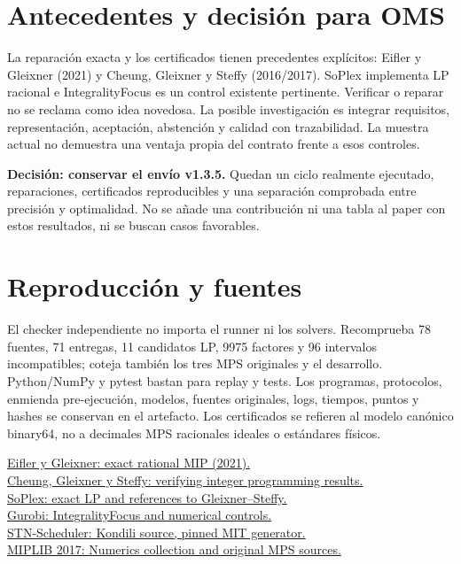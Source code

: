 \documentclass[10pt,a4paper]{article}
\begin{document}
\section*{Antecedentes y decisión para OMS}
La reparación exacta y los certificados tienen precedentes explícitos:
Eifler y Gleixner (2021) y Cheung, Gleixner y Steffy (2016/2017).
SoPlex implementa LP racional e IntegralityFocus es un control existente
pertinente. Verificar o reparar no se reclama como idea novedosa.
La posible investigación es integrar requisitos, representación, aceptación,
abstención y calidad con trazabilidad. La muestra actual no demuestra una
ventaja propia del contrato frente a esos controles.

\textbf{Decisión: conservar el envío v1.3.5.} Quedan un ciclo realmente
ejecutado, reparaciones, certificados reproducibles y una separación
comprobada entre precisión y optimalidad. No se añade una contribución
ni una tabla al paper con estos resultados, ni se buscan casos favorables.
\section*{Reproducción y fuentes}
El checker independiente no importa el runner ni los solvers. Recomprueba
78 fuentes, 71 entregas, 11 candidatos LP, 9975 factores y 96 intervalos
incompatibles; coteja también los tres MPS originales y el desarrollo. Python/NumPy y
pytest bastan para replay y tests. Los programas, protocolos, enmienda
pre-ejecución, modelos, fuentes originales, logs, tiempos, puntos y hashes
se conservan en el artefacto. Los certificados se refieren al modelo
canónico binary64, no a decimales MPS racionales ideales o estándares físicos.

\small
\href{https://arxiv.org/abs/2101.09141}{Eifler y Gleixner: exact rational MIP (2021).}\\
\href{https://arxiv.org/abs/1611.08832}{Cheung, Gleixner y Steffy: verifying integer programming results.}\\
\href{https://soplex.zib.de/doc/html/EXACT.php}{SoPlex: exact LP and references to Gleixner--Steffy.}\\
\href{https://docs.gurobi.com/projects/optimizer/en/current/reference/parameters.html}{Gurobi: IntegralityFocus and numerical controls.}\\
\href{https://github.com/jckantor/STN-Scheduler}{STN-Scheduler: Kondili source, pinned MIT generator.}\\
\href{https://miplib.zib.de/tag_numerics.html}{MIPLIB 2017: Numerics collection and original MPS sources.}
\end{document}
